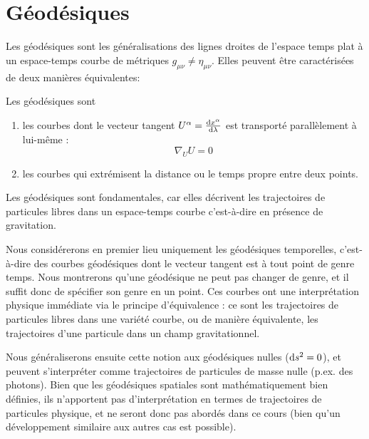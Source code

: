 \chapter{Géodésiques}

Les géodésiques sont les généralisations des lignes droites de l'espace temps plat à un espace-temps courbe de métriques $g_{\mu \nu} \neq \eta_{\mu \nu}$. Elles peuvent être caractérisées de deux manières équivalentes:

\begin{theoremframe}
    \begin{defi}
    \label{def:géodésiques1}
    Les géodésiques sont
        \begin{enumerate}
            \item les courbes dont le vecteur tangent $U^\alpha = \frac{\mathrm{d} x^\alpha}{\mathrm{d} \lambda}$ est transporté parallèlement à lui-même :
            \begin{equation}
                \nabla_U U =0
            \end{equation}
            \item les courbes qui extrémisent la distance ou le temps propre entre deux points. 
        \end{enumerate}
    \end{defi}
\end{theoremframe}
Les géodésiques sont fondamentales, car elles décrivent les trajectoires de particules libres dans un espace-temps courbe c'est-à-dire en présence de gravitation.

Nous considérerons en premier lieu uniquement les géodésiques temporelles, c'est-à-dire des courbes géodésiques dont le vecteur tangent est à tout point de genre temps. Nous montrerons qu'une géodésique ne peut pas changer de genre, et il suffit donc de spécifier son genre en un point. Ces courbes ont une interprétation physique immédiate via le principe d'équivalence : ce sont les trajectoires de particules libres dans une variété courbe, ou de manière équivalente, les trajectoires d'une particule dans un champ gravitationnel.

Nous généraliserons ensuite cette notion aux géodésiques nulles ($\mathrm{d} s^2 = 0$), et peuvent s'interpréter comme trajectoires de particules de masse nulle (p.ex. des photons). Bien que les géodésiques spatiales sont mathématiquement bien définies, ils n'apportent pas d'interprétation en termes de trajectoires de particules physique, et ne seront donc pas abordés dans ce cours (bien qu'un développement similaire aux autres cas est possible).

